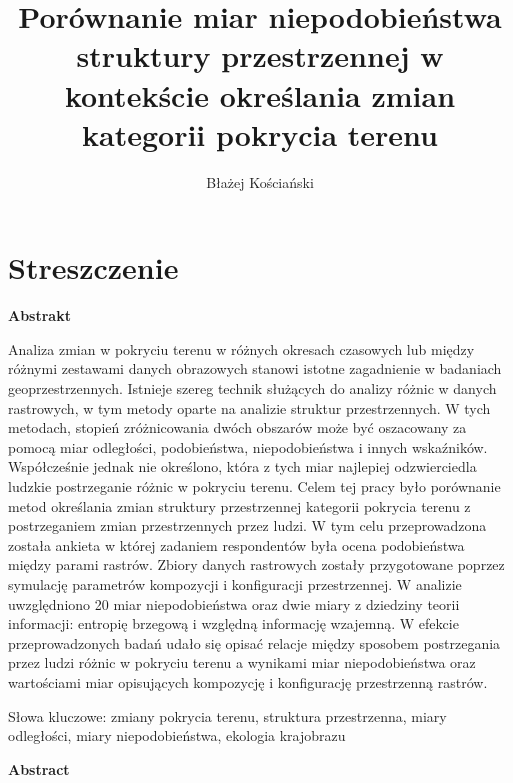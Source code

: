 \documentclass{amuthesis}
\author{Błażej Kościański}
\title{Porównanie miar niepodobieństwa struktury przestrzennej w
kontekście określania zmian kategorii pokrycia terenu}
\begin{document}

\titlepage


\hypertarget{streszczenie}{%
\chapter*{Streszczenie}\label{streszczenie}}


\textbf{Abstrakt}

Analiza zmian w pokryciu terenu w różnych okresach czasowych lub między
różnymi zestawami danych obrazowych stanowi istotne zagadnienie w
badaniach geoprzestrzennych. Istnieje szereg technik służących do
analizy różnic w danych rastrowych, w tym metody oparte na analizie
struktur przestrzennych. W tych metodach, stopień zróżnicowania dwóch
obszarów może być oszacowany za pomocą miar odległości, podobieństwa,
niepodobieństwa i innych wskaźników. Współcześnie jednak nie określono,
która z tych miar najlepiej odzwierciedla ludzkie postrzeganie różnic w
pokryciu terenu. Celem tej pracy było porównanie metod określania zmian
struktury przestrzennej kategorii pokrycia terenu z postrzeganiem zmian
przestrzennych przez ludzi. W tym celu przeprowadzona została ankieta w
której zadaniem respondentów była ocena podobieństwa między parami
rastrów. Zbiory danych rastrowych zostały przygotowane poprzez symulację
parametrów kompozycji i konfiguracji przestrzennej. W analizie
uwzględniono 20 miar niepodobieństwa oraz dwie miary z dziedziny teorii
informacji: entropię brzegową i względną informację wzajemną. W efekcie
przeprowadzonych badań udało się opisać relacje między sposobem
postrzegania przez ludzi różnic w pokryciu terenu a wynikami miar
niepodobieństwa oraz wartościami miar opisujących kompozycję i
konfigurację przestrzenną rastrów.

Słowa kluczowe: zmiany pokrycia terenu, struktura przestrzenna, miary
odległości, miary niepodobieństwa, ekologia krajobrazu

\newpage

\textbf{Abstract}
\end{document}
